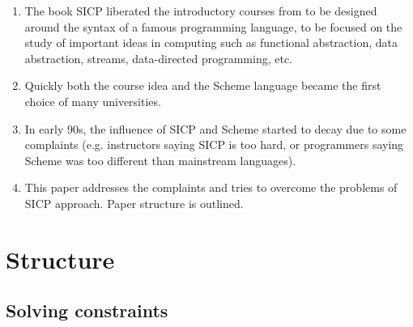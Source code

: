 \documentclass{article}
\begin{document}
\begin{enumerate}
\item The book SICP liberated the introductory courses from to be
  designed around the syntax of a famous programming language, to be
  focused on the study of important ideas in computing such as
  functional abstraction, data abstraction, streams, data-directed
  programming, etc.
\item Quickly both the course idea and the Scheme language became the
  first choice of many universities.
\item In early 90s, the influence of SICP and Scheme started to decay
  due to some complaints (e.g. instructors saying SICP is too hard, or
  programmers saying Scheme was too different than mainstream
  languages).
\item This paper addresses the complaints and tries to overcome the
  problems of SICP approach. Paper structure is outlined.
\end{enumerate}

\section{Structure}

\subsection{Solving constraints}
\end{document}

